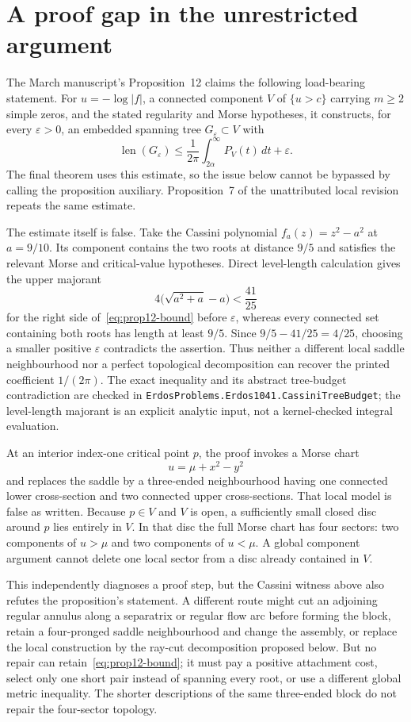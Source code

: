 \documentclass[11pt]{article}
\begin{document}
\section{A proof gap in the unrestricted argument}\label{sec:gap}

The March manuscript's Proposition~12 claims the following load-bearing
statement.  For $u=-\log|f|$, a connected component $V$ of $\{u>c\}$ carrying
$m\ge2$ simple zeros, and the stated regularity and Morse hypotheses, it
constructs, for every $\varepsilon>0$, an embedded spanning tree
$G_\varepsilon\subset V$ with
\[
 \operatorname{len}(G_\varepsilon)
 \le\frac1{2\pi}\int_{2\alpha}^{\infty}P_V(t)\,dt+\varepsilon.
\tag{5.1}\label{eq:prop12-bound}
\]
The final theorem uses this estimate, so the issue below cannot be bypassed by
calling the proposition auxiliary.  Proposition~7 of the unattributed local
revision repeats the same estimate.

The estimate itself is false.  Take the Cassini polynomial
$f_a(z)=z^2-a^2$ at $a=9/10$.  Its component contains the two roots at distance
$9/5$ and satisfies the relevant Morse and critical-value hypotheses.  Direct
level-length calculation gives the upper majorant
\[
  4\bigl(\sqrt{a^2+a}-a\bigr)<\frac{41}{25}
\]
for the right side of~\eqref{eq:prop12-bound} before $\varepsilon$, whereas
every connected set containing both roots has length at least $9/5$.  Since
$9/5-41/25=4/25$, choosing a smaller positive $\varepsilon$ contradicts the
assertion.  Thus neither a different local saddle neighbourhood nor a perfect
topological decomposition can recover the printed coefficient $1/(2\pi)$.
The exact inequality and its abstract tree-budget contradiction are checked in
\texttt{ErdosProblems.Erdos1041.CassiniTreeBudget}; the level-length majorant is
an explicit analytic input, not a kernel-checked integral evaluation.

At an interior index-one critical point $p$, the proof invokes a Morse chart
\[
 u=\mu+x^2-y^2
\]
and replaces the saddle by a three-ended neighbourhood having one connected
lower cross-section and two connected upper cross-sections.  That local model
is false as written.  Because $p\in V$ and $V$ is open, a sufficiently small
closed disc around $p$ lies entirely in $V$.  In that disc the full Morse chart
has four sectors: two components of $u>\mu$ and two components of $u<\mu$.
A global component argument cannot delete one local sector from a disc already
contained in $V$.

This independently diagnoses a proof step, but the Cassini witness above also
refutes the proposition's statement.  A different route might
cut an adjoining regular annulus along a separatrix or regular flow arc before
forming the block, retain a four-pronged saddle neighbourhood and change the
assembly, or replace the local construction by the ray-cut decomposition
proposed below.  But no repair can retain~\eqref{eq:prop12-bound}; it must pay a
positive attachment cost, select only one short pair instead of spanning every
root, or use a different global metric inequality.
The shorter descriptions of the same three-ended block do not repair the
four-sector topology.
\end{document}
